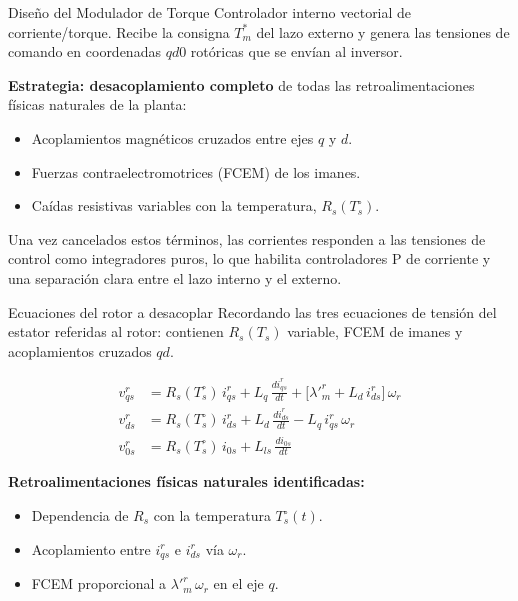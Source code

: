 \documentclass[aspectratio=169,t]{beamer}
\begin{document}
\begin{frame}{Diseño del Modulador de Torque}
{\small\color{uncGray}Controlador interno vectorial de corriente/torque. Recibe la consigna $T_m^{*}$ del lazo externo y genera las tensiones de comando en coordenadas $qd0$ rotóricas que se envían al inversor.}\par
\vspace{4mm}

\textbf{Estrategia: desacoplamiento completo} de todas las retroalimentaciones físicas naturales de la planta:
\begin{itemize}
\item Acoplamientos magnéticos cruzados entre ejes $q$ y $d$.
\item Fuerzas contraelectromotrices (FCEM) de los imanes.
\item Caídas resistivas variables con la temperatura, $R_s(T_s^\circ)$.
\end{itemize}

\vspace{2mm}
{\small Una vez cancelados estos términos, las corrientes responden a las tensiones de control como integradores puros, lo que habilita controladores P de corriente y una separación clara entre el lazo interno y el externo.}
\end{frame}

\begin{frame}{Ecuaciones del rotor a desacoplar}
{\small\color{uncGray}Recordando las tres ecuaciones de tensión del estator referidas al rotor: contienen $R_s(T_s)$ variable, FCEM de imanes y acoplamientos cruzados $qd$.}\par
\vspace{2mm}

\begin{align*}
v_{qs}^{r} &= R_s(T_s^\circ)\,i_{qs}^{r} + L_q\,\tfrac{d i_{qs}^{r}}{dt} + \big[\lambda'^r_m + L_d\,i_{ds}^{r}\big]\,\omega_r \\[3pt]
v_{ds}^{r} &= R_s(T_s^\circ)\,i_{ds}^{r} + L_d\,\tfrac{d i_{ds}^{r}}{dt} - L_q\,i_{qs}^{r}\,\omega_r \\[3pt]
v_{0s}^{r} &= R_s(T_s^\circ)\,i_{0s} + L_{ls}\,\tfrac{d i_{0s}}{dt}
\end{align*}

\vspace{2mm}
\textbf{Retroalimentaciones físicas naturales identificadas:}
\begin{itemize}
\item Dependencia de $R_s$ con la temperatura $T_s^\circ(t)$.
\item Acoplamiento entre $i_{qs}^{r}$ e $i_{ds}^{r}$ vía $\omega_r$.
\item FCEM proporcional a $\lambda'^r_m\,\omega_r$ en el eje $q$.
\end{itemize}
\end{frame}
\end{document}
